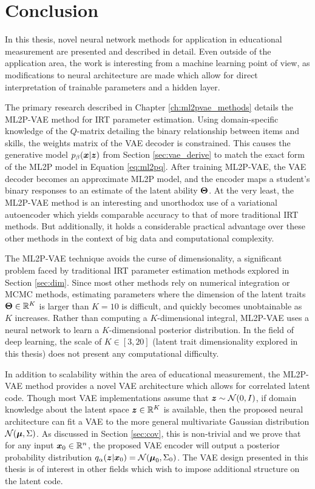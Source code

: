\section{Conclusion}
In this thesis, novel neural network methods for application in educational measurement are presented and described in detail. Even outside of the application area, the work is interesting from a machine learning point of view, as modifications to neural architecture are made which allow for direct interpretation of trainable parameters and a hidden layer.

The primary research described in Chapter \ref{ch:ml2pvae_methods} details the ML2P-VAE method for IRT parameter estimation. Using domain-specific knowledge of the $Q$-matrix detailing the binary relationship between items and skills, the weights matrix of the VAE decoder is constrained. This causes the generative model $p_\beta(\boldsymbol{x} | \boldsymbol{z})$ from Section \ref{sec:vae_derive} to match the exact form of the ML2P model in Equation \ref{eq:ml2pq}. After training ML2P-VAE, the VAE decoder becomes an approximate ML2P model, and the encoder maps a student's binary responses to an estimate of the latent ability $\boldsymbol{\Theta}$. At the very least, the ML2P-VAE method is an interesting and unorthodox use of a variational autoencoder which yields comparable accuracy to that of more traditional IRT methods. But additionally, it holds a considerable practical advantage over these other methods in the context of big data and computational complexity.

The ML2P-VAE technique avoids the curse of dimensionality, a significant problem faced by traditional IRT parameter estimation methods explored in Section \ref{sec:dim}. Since most other methods rely on numerical integration or MCMC methods, estimating parameters where the dimension of the latent traits $\boldsymbol{\Theta} \in\mathbb{R}^K$ is larger than $K=10$ is difficult, and quickly becomes unobtainable as $K$ increases. Rather than computing a $K$-dimensional integral, ML2P-VAE uses a neural network to learn a $K$-dimensional posterior distribution. In the field of deep learning, the scale of $K \in [3,20]$ (latent trait dimensionality explored in this thesis) does not present any computational difficulty.

In addition to scalability within the area of educational measurement, the ML2P-VAE method provides a novel VAE architecture which allows for correlated latent code. Though most VAE implementations assume that $\boldsymbol{z} \sim \mathcal{N}(0,I)$, if domain knowledge about the latent space $\boldsymbol{z} \in \mathbb{R}^K$ is available, then the proposed neural architecture can fit a VAE to the more general multivariate Gaussian distribution $\mathcal{N}(\boldsymbol{\mu}, \Sigma)$. As discussed in Section \ref{sec:cov}, this is non-trivial and we prove that for any input $\boldsymbol{x}_0 \in \mathbb{R}^n$, the proposed VAE encoder will output a posterior probability distribution $q_\alpha(\boldsymbol{z} | \boldsymbol{x}_0) = \mathcal{N}(\boldsymbol{\mu}_0, \Sigma_0)$. The VAE design presented in this thesis is of interest in other fields which wish to impose additional structure on the latent code.

